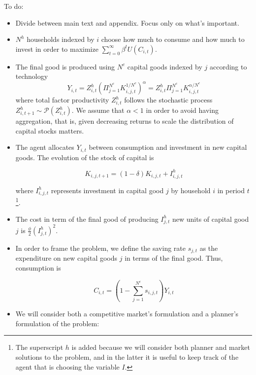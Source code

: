 \documentclass[11pt,english]{article}
\begin{document}
 {\color{red} To do: 
	
	\begin{itemize}
		\item Divide between main text and appendix. Focus only on what's important. 
\end{itemize}}


\begin{itemize}
	\item $N^h$ households indexed by $i$ choose how much to consume and how much to invest in order to maximize $\sum_{t=0}^{\infty} \beta^t U(C_{i,t})$.\medskip
	
	\item The final good is produced using $N^c$ capital goods indexed by $j$ according to technology $$Y_{i,t}=Z^h_{i,t} \left(\Pi_{j=1}^{N^c} K_{i,j,t}^{1/N^c} \right)^{\alpha} = Z^h_{i,t} \Pi_{j=1}^{N^c} K_{i,j,t}^{\alpha/N^c}$$  where total factor productivity $Z^h_{i,t}$ follows the stochastic process $Z^h_{i,t+1} \sim \mathcal P(Z^h_{i,t})$. We assume that $\alpha<1$ in order to avoid having aggregation, that is, given decreasing returns to scale the distribution of capital stocks matters.  \medskip
	
	\item The agent allocates $Y_{i,t}$ between consumption and investment in new capital goods. The evolution of the stock of capital is 
	
	$$K_{i,j,t+1} = (1-\delta) K_{i,j,t} + I^h_{i,j,t}$$ 
	
	where $I^h_{i,j,t}$ represents investment in capital good $j$ by household $i$ in period $t$\footnote{The superscript $h$ is added because we will consider both planner and market solutions to the problem, and in the latter it is useful to keep track of the agent that is choosing the variable $I$.}. 
	
	\item The cost in term of the final good of  producing $I^h_{j,t}$ new units of capital good $j$  is $\frac{\phi}{2} \left(I^h_{j,t}\right)^2$.  \medskip
	
	\item In order to frame the problem, we define the saving rate $s_{j,t}$ as the expenditure on new capital goods $j$ in terms of the final good. Thus, consumption is 
	
	$$C_{i,t}=(1-\sum_{j=1}^{N^c} s_{i,j,t})Y_{i,t}$$ 
	
	\item We will consider both a competitive market's formulation and a planner's formulation of the problem: 
	

\end{itemize}
\end{document}
